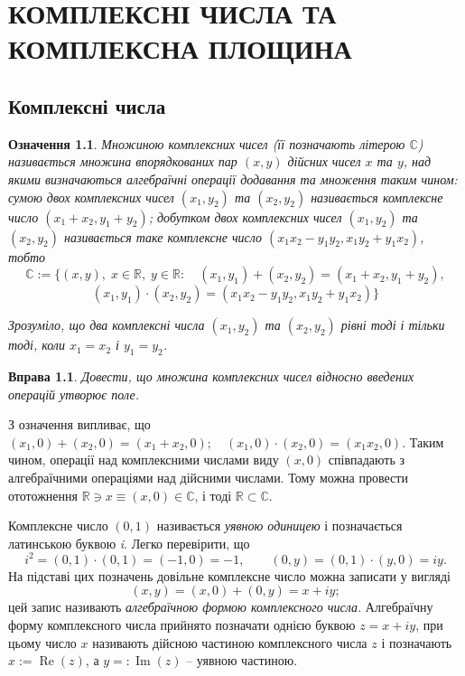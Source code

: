 \documentclass[10pt]{report} %
\renewcommand\Re{\operatorname{Re}}
\renewcommand\Im{\operatorname{Im}}
\let\oldChapter\chapter
\renewcommand{\chapter}[1]{\oldChapter{\MakeUppercase{\LARGE #1}}\thispagestyle{myheadings}}
\newtheorem{definition}{Означення}[section]
\newtheorem{exercise}{Вправа}
\begin{document}
\setcounter{page}{5}
\chapter{Комплексні числа та комплексна площина}
\section{Комплексні числа}
\begin{definition}
Множиною комплексних чисел (її позначають літерою $\mathbb{C}$) називається множина впорядкованих пар $(x,y)$ дійсних чисел $x$ та $y$, над якими визначаються алгебраїчні операції додавання та множення таким чином:
сумою двох комплексних чисел $(x_1,y_2)$ та $(x_2,y_2)$ називається комплексне число $(x_1+x_2,y_1+y_2)$; добутком двох комплексних чисел $(x_1,y_2)$ та $(x_2,y_2)$ називається таке комплексне число $(x_1x_2-y_1y_2,x_1y_2+y_1x_2)$,
тобто
\[\mathbb{C}:=\{(x,y),\;x\in \mathbb{R},\;y\in\mathbb{R}:\quad (x_1,y_1)+(x_2,y_2)=(x_1+x_2,y_1+y_2),\]
\[(x_1,y_1)\cdot(x_2,y_2)=(x_1x_2-y_1y_2,x_1y_2+y_1x_2)\}\]

Зрозуміло, що два комплексні числа $(x_1,y_2)$ та $(x_2,y_2)$ рівні тоді і тільки тоді, коли $x_1=x_2$ і $y_1=y_2$.
\end{definition}
\begin{exercise}
Довести, що множина комплексних чисел відносно введених операцій утворює поле.
\end{exercise}

З означення випливає, що $(x_1,0)+(x_2,0)=(x_1+x_2,0);\quad (x_1,0)\cdot(x_2,0)=(x_1x_2,0)$. Таким чином, операції над комплексними числами виду $(x,0)$ співпадають з алгебраїчними операціями над дійсними числами. Тому можна провести
ототожнення $\mathbb{R}\ni x\equiv (x,0)\in \mathbb{C}$, і тоді $\mathbb{R}\subset\mathbb{C}$.

Комплексне число $(0,1)$ називається \textit{уявною одиницею} і позначається латинською буквою \textit{i}. Легко перевірити, що
\[i^2=(0,1)\cdot(0,1)=(-1,0)=-1,\qquad (0,y)=(0,1)\cdot(y,0)=iy.\]
На підставі цих позначень довільне комплексне число можна записати у вигляді
\[(x,y)=(x,0)+(0,y)=x+iy;\]
цей запис називають \textit{алгебраїчною формою комплексного числа.} Алгебраїчну форму комплексного числа прийнято позначати однією буквою $z=x+iy$, при цьому число $x$ називають дійсною частиною комплексного числа $z$ і
позначають $x:=\Re(z)$, а $y=:\Im(z)$ -- уявною частиною.
\end{document}
